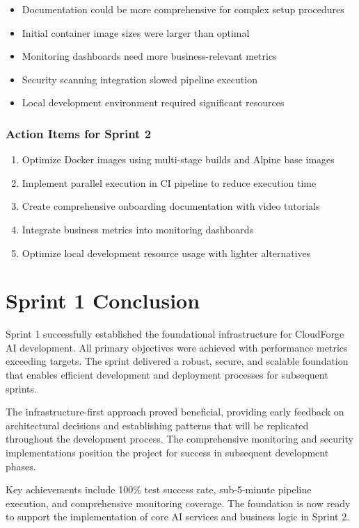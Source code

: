 \begin{itemize}
    \item Documentation could be more comprehensive for complex setup procedures
    \item Initial container image sizes were larger than optimal
    \item Monitoring dashboards need more business-relevant metrics
    \item Security scanning integration slowed pipeline execution
    \item Local development environment required significant resources
\end{itemize}

\subsubsection{Action Items for Sprint 2}

\begin{enumerate}
    \item Optimize Docker images using multi-stage builds and Alpine base images
    \item Implement parallel execution in CI pipeline to reduce execution time
    \item Create comprehensive onboarding documentation with video tutorials
    \item Integrate business metrics into monitoring dashboards
    \item Optimize local development resource usage with lighter alternatives
\end{enumerate}

\section{Sprint 1 Conclusion}

Sprint 1 successfully established the foundational infrastructure for CloudForge AI development. All primary objectives were achieved with performance metrics exceeding targets. The sprint delivered a robust, secure, and scalable foundation that enables efficient development and deployment processes for subsequent sprints.

The infrastructure-first approach proved beneficial, providing early feedback on architectural decisions and establishing patterns that will be replicated throughout the development process. The comprehensive monitoring and security implementations position the project for success in subsequent development phases.

Key achievements include 100\% test success rate, sub-5-minute pipeline execution, and comprehensive monitoring coverage. The foundation is now ready to support the implementation of core AI services and business logic in Sprint 2.